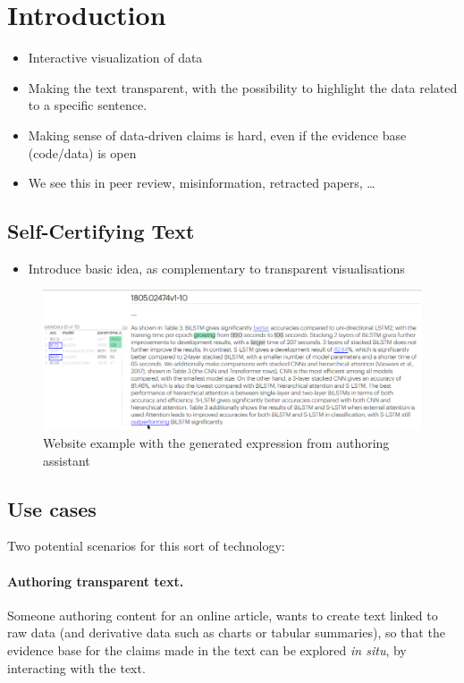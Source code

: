 \section{Introduction}

\begin{itemize}
    \item Interactive visualization of data
    \item Making the text transparent, with the possibility to highlight the data related to a specific sentence.
    \item Making sense of data-driven claims is hard, even if the evidence base (code/data) is open
    \item We see this in peer review, misinformation, retracted papers, …
\end{itemize}

\subsection{Self-Certifying Text}

\begin{itemize}
    \item Introduce basic idea, as complementary to transparent visualisations
\end{itemize}

\begin{figure}
    \centering
    \includegraphics[width=\linewidth]{fig/scigen-mr-1906.02780-10.png}
    \caption{Website example with the generated expression from authoring assistant}\label{fig:scigen-example-website}
\end{figure}


\subsection{Use cases}
Two potential scenarios for this sort of technology:

\paragraph{Authoring transparent text.} Someone authoring content for an online article, wants to create text
linked to raw data (and derivative data such as charts or tabular summaries), so that the evidence base for
the claims made in the text can be explored \emph{in situ}, by interacting with the text.

